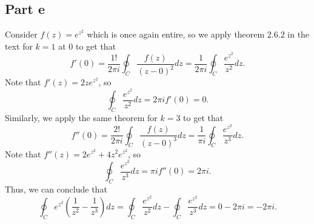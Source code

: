 \documentclass{article}
\begin{document}
\subsection{Part e}
Consider $f(z)=e^{z^2}$ which is once again entire, so we apply theorem 2.6.2 in the text for $k=1$ at 0 to get that
\[
f'(0)=\frac{1!}{2\pi i}\oint_C\frac{f(z)}{(z-0)^2}dz=\frac{1}{2\pi i}\oint_C\frac{e^{z^2}}{z^2}dz.
\]
Note that $f'(z)=2ze^{z^2}$, so 
\[
\oint_C\frac{e^{z^2}}{z^2}dz=2\pi i f'(0)= 0.
\]
Similarly, we apply the same theorem for $k=3$ to get that 
\[
f''(0)=\frac{2!}{2\pi i}\oint_C\frac{f(z)}{(z-0)^3}dz=\frac{1}{\pi i}\oint_C\frac{e^{z^2}}{z^3}dz.
\]
Note that $f''(z)=2e^{z^2}+4z^2e^{z^2}$, so 
\[
\oint_C\frac{e^{z^2}}{z^3}dz=\pi i f''(0)=2\pi i.
\]
Thus, we can conclude that 
\[
\oint_Ce^{z^2}\left(\frac{1}{z^2}-\frac{1}{z^3}\right)dz=\oint_C\frac{e^{z^2}}{z^2}dz-\oint_C\frac{e^{z^2}}{z^3}dz=0-2\pi i=-2\pi i.
\]
\end{document}
